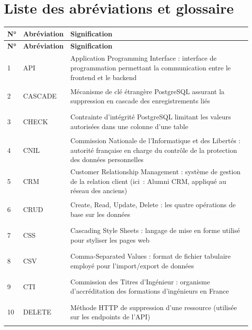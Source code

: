 \documentclass[12pt,a4paper]{report}
\begin{document}
\newpage
\chapter*{Liste des abréviations et glossaire}

\begin{longtable}{@{} l l >{\RaggedRight\arraybackslash}p{12.0cm} @{}}
\toprule
\textbf{N°} & \textbf{Abréviation} & \textbf{Signification} \\
\midrule
\endfirsthead
\toprule
\textbf{N°} & \textbf{Abréviation} & \textbf{Signification} \\
\midrule
\endhead
\bottomrule
\endfoot
\hypertarget{abbr-API}{1} & API & Application Programming Interface : interface de programmation permettant la communication entre le frontend et le backend \\
\hypertarget{abbr-CASCADE}{2} & CASCADE & Mécanisme de clé étrangère PostgreSQL assurant la suppression en cascade des enregistrements liés \\
\hypertarget{abbr-CHECK}{3} & CHECK & Contrainte d'intégrité PostgreSQL limitant les valeurs autorisées dans une colonne d'une table \\
\hypertarget{abbr-CNIL}{4} & CNIL & Commission Nationale de l'Informatique et des Libertés : autorité française en charge du contrôle de la protection des données personnelles \\
\hypertarget{abbr-CRM}{5} & CRM & Customer Relationship Management : système de gestion de la relation client (ici~: Alumni CRM, appliqué au réseau des anciens) \\
\hypertarget{abbr-CRUD}{6} & CRUD & Create, Read, Update, Delete : les quatre opérations de base sur les données \\
\hypertarget{abbr-CSS}{7} & CSS & Cascading Style Sheets : langage de mise en forme utilisé pour styliser les pages web \\
\hypertarget{abbr-CSV}{8} & CSV & Comma-Separated Values : format de fichier tabulaire employé pour l'import/export de données \\
\hypertarget{abbr-CTI}{9} & CTI & Commission des Titres d'Ingénieur : organisme d'accréditation des formations d'ingénieurs en France \\
\hypertarget{abbr-DELETE}{10} & DELETE & Méthode HTTP de suppression d'une ressource (utilisée sur les endpoints de l'API) \\

\end{longtable}
\end{document}
